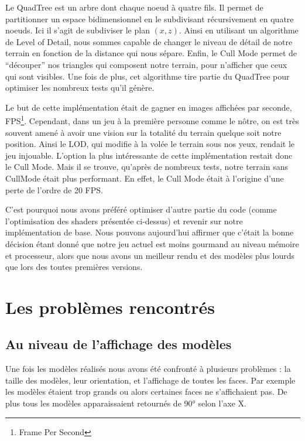 \documentclass[11pt]{report}
\begin{document}
Le QuadTree est un arbre dont chaque noeud à quatre fils. Il permet de partitionner un espace bidimensionnel en le subdivisant récursivement en quatre noeuds. Ici il s'agit de subdiviser le plan \((x,z)\). Ainsi en utilisant un algorithme de Level of Detail, nous sommes capable de changer le niveau de détail de notre terrain en fonction de la distance qui nous sépare. Enfin, le Cull Mode permet de ``découper'' nos triangles qui composent notre terrain, pour n'afficher que ceux qui sont visibles. Une fois de plus, cet algorithme tire partie du QuadTree pour optimiser les nombreux tests qu'il génère.

Le but de cette implémentation était de gagner en images affichées par seconde, FPS\footnote{Frame Per Second}. Cependant, dans un jeu à la première personne comme le nôtre, on est très souvent amené à avoir une vision sur la totalité du terrain quelque soit notre position. Ainsi le LOD, qui modifie à la volée le terrain sous nos yeux, rendait le jeu injouable. L'option la plus intéressante de cette implémentation restait donc le Cull Mode. Mais il se trouve, qu'après de nombreux tests, notre terrain sans CullMode était plus performant. En effet, le Cull Mode était à l'origine d'une perte de l'ordre de 20 FPS.

C'est pourquoi nous avons préféré optimiser d'autre partie du code (comme l'optimisation des shaders présentée ci-dessus) et revenir sur notre implémentation de base. Nous pouvons aujourd'hui affirmer que c'était la bonne décision étant donné que notre jeu actuel est moins gourmand au niveau mémoire et processeur, alors que nous avons un meilleur rendu et des modèles plus lourds que lors des toutes premières versions.

\section{Les problèmes rencontrés}

\subsection{Au niveau de l'affichage des modèles}

Une fois les modèles réalisés nous avons été confronté à plusieurs problèmes : la taille des modèles, leur orientation, et l’affichage de toutes les faces. Par exemple les modèles étaient trop grands ou alors certaines faces ne s'affichaient pas. De plus tous les modèles apparaissaient retournés de \ang{90} selon l'axe X.
\end{document}
